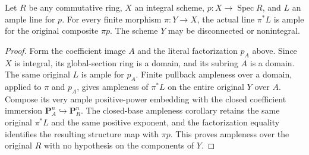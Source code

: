 \begin{theorem}
\label{thm:kn-relative-finite-ample-original-base}
\leanok
{}
Let $R$ be any commutative ring, $X$ an integral scheme,
$p:X\to\operatorname{Spec}R$, and $L$ an ample line for $p$.
For every finite morphism $\pi:Y\to X$, the actual line $\pi^*L$
is ample for the original composite $\pi p$. The scheme $Y$ may
be disconnected or nonintegral.
\end{theorem}
\begin{proof}
Form the coefficient image $A$ and the literal factorization $p_A$
above. Since $X$ is integral, its global-section ring is a domain,
and its subring $A$ is a domain. The same original $L$ is ample for $p_A$. Finite
pullback ampleness over a domain, applied to $\pi$ and $p_A$, gives
ampleness of $\pi^*L$ on the entire original $Y$ over $A$.
Compose its very ample positive-power embedding with the closed
coefficient immersion $\mathbf P^n_A\hookrightarrow\mathbf P^n_R$.
The closed-base ampleness corollary retains the same original
$\pi^*L$ and the same positive exponent, and the factorization equality
identifies the resulting structure map with $\pi p$. This proves
ampleness over the original $R$ with no hypothesis on the components
of $Y$.
\end{proof}
